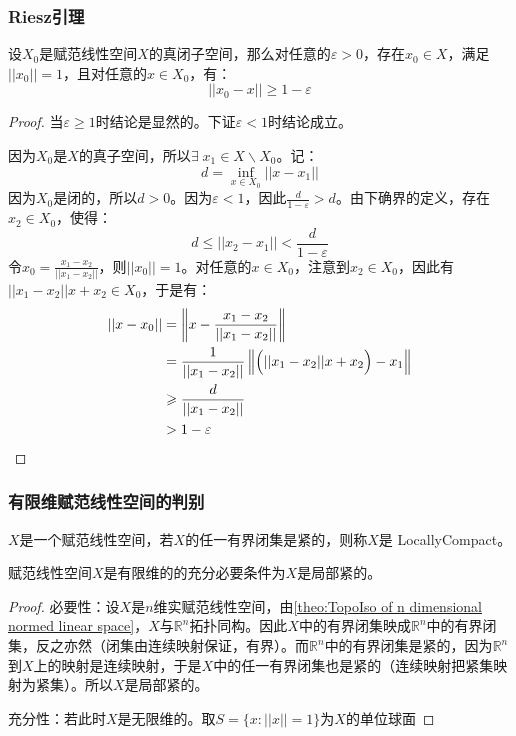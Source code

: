 \subsubsection{Riesz引理}
\begin{lemma}
	设$X_0$是赋范线性空间$X$的真闭子空间，那么对任意的$\varepsilon>0$，存在$x_0\in X$，满足$||x_0||=1$，且对任意的$x\in X_0$，有：
	\begin{equation*}
		||x_0-x||\geqslant 1-\varepsilon
	\end{equation*}
\end{lemma}
\begin{proof}
	当$\varepsilon\geqslant1$时结论是显然的。下证$\varepsilon<1$时结论成立。\par
	因为$X_0$是$X$的真子空间，所以$\exists\;x_1\in X\backslash X_0$。记：
	\begin{equation*}
		d=\inf_{x\in X_0}||x-x_1||
	\end{equation*}
	因为$X_0$是闭的，所以$d>0$。因为$\varepsilon<1$，因此$\frac{d}{1-\varepsilon}>d$。由下确界的定义，存在$x_2\in X_0$，使得：
	\begin{equation*}
		d\leqslant||x_2-x_1||<\frac{d}{1-\varepsilon}
	\end{equation*}
	令$x_0=\frac{x_1-x_2}{||x_1-x_2||}$，则$||x_0||=1$。对任意的$x\in X_0$，注意到$x_2\in X_0$，因此有$||x_1-x_2||x+x_2\in X_0$，于是有：
	\begin{align*}
		||x-x_0||&=\left\|x-\frac{x_1-x_2}{||x_1-x_2||}\right\| \\
		&=\frac{1}{||x_1-x_2||}\left\|\Bigl(||x_1-x_2||x+x_2\Bigr)-x_1\right\| \\
		&\geqslant\frac{d}{||x_1-x_2||} \\
		&>1-\varepsilon\qedhere
	\end{align*}
\end{proof}
\subsubsection{有限维赋范线性空间的判别}
\begin{definition}
	$X$是一个赋范线性空间，若$X$的任一有界闭集是紧的，则称$X$是
	\gls{LocallyCompact}。
\end{definition}
\begin{theorem}
	赋范线性空间$X$是有限维的的充分必要条件为$X$是局部紧的。
\end{theorem}
\begin{proof}
	必要性：设$X$是$n$维实赋范线性空间，由\cref{theo:TopoIso of n dimensional normed linear space}，$X$与$\mathbb{R}^n$拓扑同构。因此$X$中的有界闭集映成$\mathbb{R}^n$中的有界闭集，反之亦然（闭集由连续映射保证，有界）。而$\mathbb{R}^n$中的有界闭集是紧的，因为$\mathbb{R}^{n}$到$X$上的映射是连续映射，于是$X$中的任一有界闭集也是紧的（连续映射把紧集映射为紧集）。所以$X$是局部紧的。\par
	充分性：若此时$X$是无限维的。取$S=\{x:||x||=1\}$为$X$的单位球面
\end{proof}


